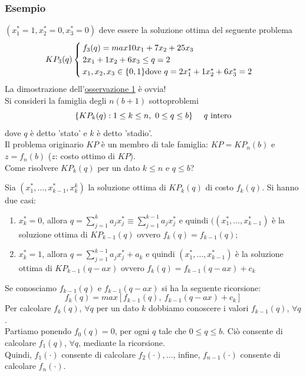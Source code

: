 \subsubsection{Esempio}
$(x_{1}^{*}=1,x_{2}^{*}=0,x_{3}^{*}=0)$ deve essere la soluzione ottima del seguente problema
\begin{equation*}
	KP_{3}(q)
	\begin{cases}
		f_{3}(q)=max 10x_{1}+7x_{2}+25x_{3} \\
		2x_{1}+1x_{2}+6x_{3}\le q=2 \\
		x_{1},x_{2},x_{3}\in\{0,1\}
		\textnormal{dove }q=2x_{1}^{*}+1x_{2}^{*}+6x_{3}^{*}=2
	\end{cases}
\end{equation*}
La dimostrazione dell'\hyperref[ss:osservazione_1]{osservazione 1} è ovvia!\\
Si consideri la famiglia degli $n(b+1)$ sottoproblemi
\begin{equation*}
	\{KP_{k}(q):1\le k\le n,\ 0\le q\le b\}\ \ \ \ q\textnormal{ intero}
\end{equation*}
dove $q$ è detto 'stato' e $k$ è detto 'stadio'.\\
Il problema originario $KP$ è un membro di tale famiglia: $KP=KP_{n}(b)$ e $z=f_{n}(b)$ ($z$: costo ottimo di $KP$).\\

Come risolvere $KP_{k}(q)$ per un dato $k\le n$ e $q\le b$?

Sia $(x_{1}^{*},\dots,x_{k-1}^{*},x_{k}^{k})$ la soluzione ottima di $KP_{k}(q)$ di costo $f_{k}(q)$. Si hanno due casi:
\begin{enumerate}
	\item $x_{k}^{*}=0$, allora $q=\sum_{j=1}^{k}a_{j}x_{j}^{*}\equiv\sum_{j=1}^{k-1}a_{j}x_{j}^{*}$ e quindi $((x_{1}^{*},\dots,x_{k-1}^{*})$ è la soluzione ottima di $KP_{k-1}(q)$ ovvero $f_{k}(q)=f_{k-1}(q)$;
	\item $x_{k}^{*}=1$, allora $q=\sum_{j=1}^{k-1}a_{j}x_{j}^{*}+a_{k}$ e quindi $(x_{1}^{*},\dots,x_{k-1}^{*})$ è la soluzione ottima di $KP_{k-1}(q-ax)$ ovvero $f_{k}(q)=f_{k-1}(q-ax)+c_{k}$
\end{enumerate}
Se conosciamo $f_{k-1}(q)$ e $f_{k-1}(q-ax)$ si ha la seguente ricorsione:
\begin{equation*}
	f_{k}(q)=max[f_{k-1}(q),\ f_{k-1}(q-ax)+c_{k}]
\end{equation*}
Per calcolare $f_{k}(q)$, $\forall q$ per un dato $k$ dobbiamo conoscere i valori $f_{k-1}(q)$, $\forall q$.\\
Partiamo ponendo $f_{0}(q)=0$, per ogni $q$ tale che $0\le q\le b$. Ciò consente di calcolare $f_{1}(q)$, $\forall q$, mediante la ricorsione.\\
Quindi, $f_{1}(\cdot)$ consente di calcolare $f_{2}(\cdot),\dots$, infine, $f_{n-1}(\cdot)$ consente di calcolare $f_{n}(\cdot)$.
